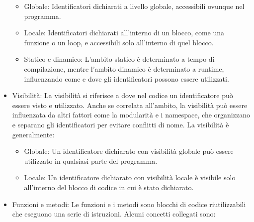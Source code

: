 \documentclass[
  letterpaper,
  DIV=11,
  numbers=noendperiod]{scrreprt}
\providecommand{\tightlist}{%
  \setlength{\itemsep}{0pt}\setlength{\parskip}{0pt}}\usepackage{longtable,booktabs,array}
\begin{document}
\begin{itemize}
  \begin{itemize}
  \tightlist
  \item
    Globale: Identificatori dichiarati a livello globale, accessibili
    ovunque nel programma.
  \item
    Locale: Identificatori dichiarati all'interno di un blocco, come una
    funzione o un loop, e accessibili solo all'interno di quel blocco.
  \item
    Statico e dinamico: L'ambito statico è determinato a tempo di
    compilazione, mentre l'ambito dinamico è determinato a runtime,
    influenzando come e dove gli identificatori possono essere
    utilizzati.
  \end{itemize}
\item
  Visibilità: La visibilità si riferisce a dove nel codice un
  identificatore può essere visto e utilizzato. Anche se correlata
  all'ambito, la visibilità può essere influenzata da altri fattori come
  la modularità e i namespace, che organizzano e separano gli
  identificatori per evitare conflitti di nome. La visibilità è
  generalmente:

  \begin{itemize}
  \tightlist
  \item
    Globale: Un identificatore dichiarato con visibilità globale può
    essere utilizzato in qualsiasi parte del programma.
  \item
    Locale: Un identificatore dichiarato con visibilità locale è
    visibile solo all'interno del blocco di codice in cui è stato
    dichiarato.
  \end{itemize}
\item
  Funzioni e metodi: Le funzioni e i metodi sono blocchi di codice
  riutilizzabili che eseguono una serie di istruzioni. Alcuni concetti
  collegati sono:


\end{itemize}
\end{document}
